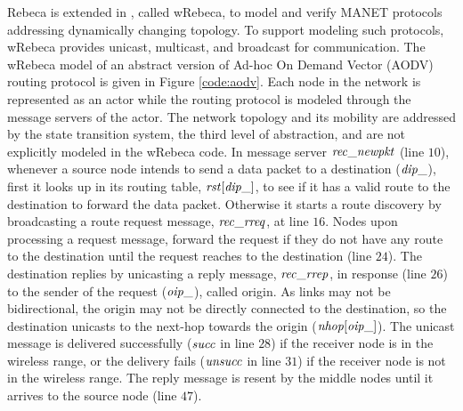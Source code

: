 Rebeca is extended in \cite{FOAC}, called wRebeca, to model and verify MANET protocols addressing dynamically changing topology. To support modeling such protocols, wRebeca provides unicast, multicast, and broadcast for communication. The wRebeca model of an abstract version of Ad-hoc On Demand Vector (AODV) routing protocol \cite{AODV} is given in Figure \ref{code:aodv}. Each node in the network is represented as an actor while the routing protocol is modeled through the message servers of the actor. The network topology and its mobility are addressed by the state transition system, the third level of abstraction, and are not explicitly modeled in the wRebeca code.  In message server ${\it rec\_newpkt}$ (line $10$),
whenever a source node intends to send a data packet to a destination (${\it dip\_}$), first it looks up in its routing table, ${\it rst}[{\it dip\_}]$, to see if it has a valid route to the destination to forward the data packet. Otherwise it starts a route discovery by broadcasting a route request message, ${\it rec\_rreq}$, at line $16$. Nodes upon processing a request message, forward the request if they do not have any route to the destination until the request reaches to the destination (line $24$). The destination replies by unicasting a reply message, ${\it rec\_rrep}$, in response (line $26$) to the sender of the request (${\it oip\_}$), called origin. As links may not be bidirectional, the origin may not be directly connected to the destination, so the destination unicasts to the next-hop towards the origin (${\it nhop}[{\it oip\_}]$). The unicast message is delivered
successfully ($\it succ$ in line $28$) if the receiver node is in the wireless range, or the
delivery fails ($\it unsucc$ in line $31$) if the receiver node is not in the wireless range. The reply message is resent by the middle nodes until it arrives to the source node (line $47$).

\begin{figure*}
	\begin{center}
		
	\end{center}
	\caption{The AODV protocol specified by wRebeca \label{code:aodv}\cite{FOAC}}
\end{figure*} 


